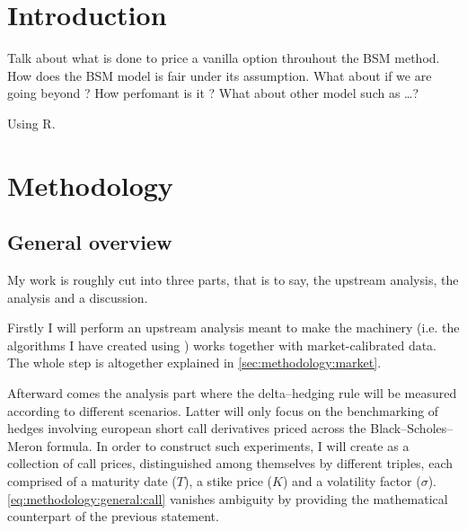\documentclass[12pt]{report}
\begin{document}

\tableofcontents{}



%
%
\chapter*{Introduction}
\label{cha:Introduction}

Talk about what is done to price a vanilla option throuhout the BSM method.
How does the BSM model is fair under its assumption. What about if we are going beyond ?
How perfomant is it ? 
What about other model such as \ldots ?

Using R. \cite{R}
%
%
\chapter{Methodology}
\label{cha:Methodology}


\section{General overview}
\label{sec:methodology:general}

My work is roughly cut into three parts, that is to say, the upstream analysis, the analysis and a discussion.

Firstly I will perform an upstream analysis meant to make the machinery (i.e. the algorithms I have created using \cite{R}) works together with market-calibrated data.
The whole step is altogether explained in \cref{sec:methodology:market}.

Afterward comes the analysis part where the delta--hedging rule will be measured according to different scenarios.
Latter will only focus on the benchmarking of hedges involving european short call derivatives priced across the Black--Scholes--Meron formula.
In order to construct such experiments, I will create as a collection of call prices, distinguished among themselves by different triples, each comprised of a maturity date ($T$), a stike price ($K$) and a volatility factor ($\sigma$).
\cref{eq:methodology:general:call} vanishes ambiguity by providing the mathematical counterpart of the previous statement.
\end{document}
